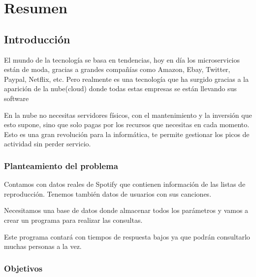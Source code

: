 \documentclass[12pt]{report} %
\begin{document}
\listoffigures
\thispagestyle{fancy}

\newpage %
\thispagestyle{empty}
\mbox{}

\listoftables
\thispagestyle{fancy}

\newpage %
\thispagestyle{empty}
\mbox{}


\clearpage
{} %

\chapter{Resumen}
\section{Introducción}
	El mundo de la tecnología se basa en tendencias, hoy en día los microservicios están de moda, gracias a grandes compañías como Amazon, Ebay, Twitter, Paypal, Netflix, etc. Pero realmente es una tecnología que ha surgido gracias a la aparición de la nube(cloud) donde todas estas empresas se están llevando sus software
	
	En la nube no necesitas servidores físicos, con el mantenimiento y la inversión que esto supone, sino que solo pagas por los recursos que necesitas en cada momento. Esto es una gran revolución para la informática, te permite gestionar los picos de actividad sin perder servicio.
	
	
	\subsection{Planteamiento del problema}
	Contamos con datos reales de Spotify que contienen información de las listas de reproducción.
	Tenemos también datos de usuarios con sus canciones.

	Necesitamos una base de datos donde almacenar todos los parámetros y vamos a crear un programa para realizar las consultas.	
		
	Este programa contará con tiempos de respuesta bajos ya que podrán consultarlo muchas personas a la vez.
		
	\subsection{Objetivos}
		
\end{document}
